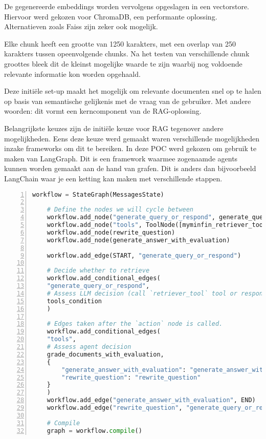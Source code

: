 De gegenereerde embeddings worden vervolgens opgeslagen in een vectorstore. Hiervoor werd gekozen voor ChromaDB, een performante oplossing. Alternatieven zoals Faiss zijn zeker ook mogelijk.

Elke chunk heeft een grootte van 1250 karakters, met een overlap van 250 karakters tussen opeenvolgende chunks. Na het testen van verschillende chunk groottes bleek dit de kleinst mogelijke waarde te zijn waarbij nog voldoende relevante informatie kon worden opgehaald.

Deze initiële set-up maakt het mogelijk om relevante documenten snel op te halen op basis van semantische gelijkenis met de vraag van de gebruiker. Met andere woorden: dit vormt een kerncomponent van de RAG-oplossing.


Belangrijkste keuzes zijn de initiële keuze voor RAG tegenover andere mogelijkheden. Eens deze keuze werd gemaakt waren verschillende mogelijkheden inzake frameworks om dit te bereiken. In deze POC werd gekozen om gebruik te maken van LangGraph. Dit is een framework waarmee zogenaamde agents kunnen worden gemaakt aan de hand van grafen. Dit is anders dan bijvoorbeeld LangChain waar je een ketting kan maken met verschillende stappen.


\begin{lstlisting}[basicstyle=\small, frame=single, breaklines=true, postbreak=\mbox{\textcolor{red}{$\hookrightarrow$}\space}, escapeinside ={\%,}, escapechar={!}, numbers=left, language=Python, caption=Graph build]
    workflow = StateGraph(MessagesState)
    
    # Define the nodes we will cycle between
    workflow.add_node("generate_query_or_respond", generate_query_or_respond)
    workflow.add_node("tools", ToolNode([myminfin_retriever_tool]))
    workflow.add_node(rewrite_question)
    workflow.add_node(generate_answer_with_evaluation)
    
    workflow.add_edge(START, "generate_query_or_respond")
    
    # Decide whether to retrieve
    workflow.add_conditional_edges(
    "generate_query_or_respond",
    # Assess LLM decision (call `retriever_tool` tool or respond to the user)
    tools_condition
    )
    
    # Edges taken after the `action` node is called.
    workflow.add_conditional_edges(
    "tools",
    # Assess agent decision
    grade_documents_with_evaluation,
    {
        "generate_answer_with_evaluation": "generate_answer_with_evaluation",
        "rewrite_question": "rewrite_question"
    }
    )
    workflow.add_edge("generate_answer_with_evaluation", END)
    workflow.add_edge("rewrite_question", "generate_query_or_respond")
    
    # Compile
    graph = workflow.compile()
\end{lstlisting}

